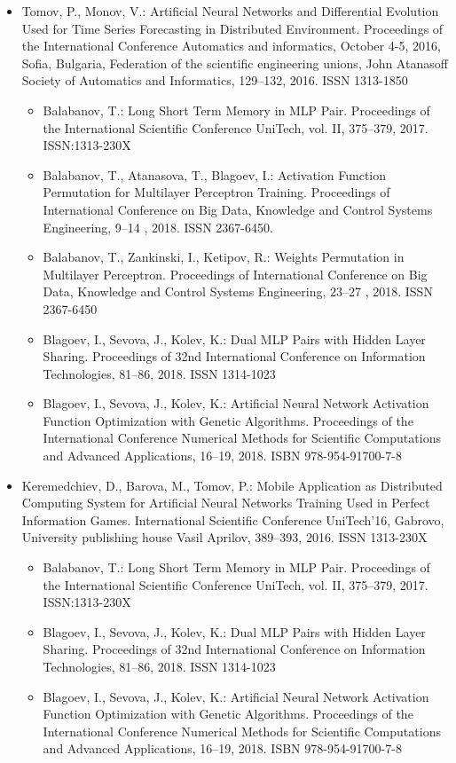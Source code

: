 \begin{itemize}
\item Tomov, P., Monov, V.: Artificial Neural Networks and Differential Evolution Used for Time Series Forecasting in Distributed Environment. Proceedings of the International Conference Automatics and informatics, October 4-5, 2016, Sofia, Bulgaria, Federation of the scientific engineering unions, John Atanasoff Society of Automatics and Informatics, 129--132, 2016. ISSN 1313-1850
	\begin{itemize}
	\item Balabanov, T.: Long Short Term Memory in MLP Pair. Proceedings of the International Scientific Conference UniTech, vol. II, 375--379, 2017. ISSN:1313-230X
	\item Balabanov, T., Atanasova, T., Blagoev, I.: Activation Function Permutation for Multilayer Perceptron Training. Proceedings of International Conference on Big Data, Knowledge and Control Systems Engineering, 9--14 , 2018. ISSN 2367-6450.
	\item Balabanov, T., Zankinski, I., Ketipov, R.: Weights Permutation in Multilayer Perceptron. Proceedings of International Conference on Big Data, Knowledge and Control Systems Engineering, 23--27 , 2018. ISSN 2367-6450
	\item Blagoev, I., Sevova, J., Kolev, K.: Dual MLP Pairs with Hidden Layer Sharing. Proceedings of 32nd International Conference on Information Technologies, 81--86, 2018. ISSN 1314-1023
	\item Blagoev, I., Sevova, J., Kolev, K.: Artificial Neural Network Activation Function Optimization with Genetic Algorithms. Proceedings of the International Conference Numerical Methods for Scientific Computations and Advanced Applications, 16--19, 2018. ISBN 978-954-91700-7-8
	\end{itemize}

\item Keremedchiev, D., Barova, M., Tomov, P.: Mobile Application as Distributed Computing System for Artificial Neural Networks Training Used in Perfect Information Games. International Scientific Conference UniTech’16, Gabrovo, University publishing house Vasil Aprilov, 389--393, 2016. ISSN 1313-230X
	\begin{itemize}
	\item Balabanov, T.: Long Short Term Memory in MLP Pair. Proceedings of the International Scientific Conference UniTech, vol. II, 375--379, 2017. ISSN:1313-230X
	\item Blagoev, I., Sevova, J., Kolev, K.: Dual MLP Pairs with Hidden Layer Sharing. Proceedings of 32nd International Conference on Information Technologies, 81--86, 2018. ISSN 1314-1023
	\item Blagoev, I., Sevova, J., Kolev, K.: Artificial Neural Network Activation Function Optimization with Genetic Algorithms. Proceedings of the International Conference Numerical Methods for Scientific Computations and Advanced Applications, 16--19, 2018. ISBN 978-954-91700-7-8
	\end{itemize}
\end{itemize}

